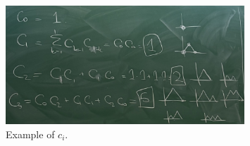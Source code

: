 \begin{figure}[H]
    \centering
    \includegraphics[width=0.8\textwidth]{./Figures/IMG_0125.jpg}
    \caption{Example of \(c_i\).}
\end{figure}